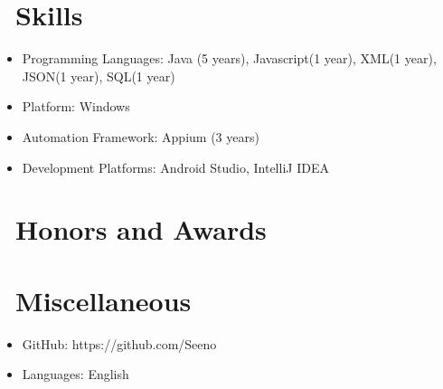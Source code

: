 \documentclass{resume}
\begin{document}
\section{\faCogs\ Skills}
\begin{itemize}[parsep=0.5ex]
  \item Programming Languages: Java (5 years), Javascript(1 year), XML(1 year), JSON(1 year), SQL(1 year)
  \item Platform: Windows
  \item Automation Framework: Appium (3 years)
  \item Development Platforms: Android Studio, IntelliJ IDEA
\end{itemize}

\section{\faHeartO\ Honors and Awards}


\section{\faInfo\ Miscellaneous}
\begin{itemize}[parsep=0.5ex]
  \item GitHub: {\color{blue}https://github.com/Seeno}
  \item Languages: English
\end{itemize}

%
%
\end{document}
